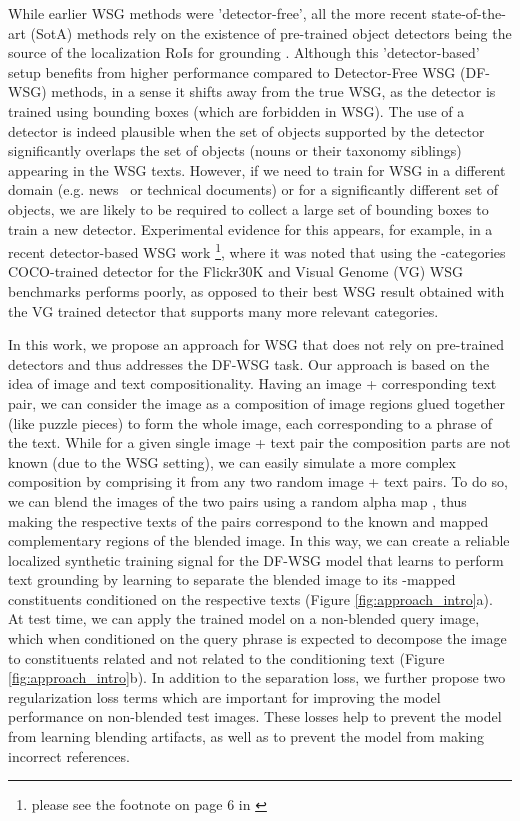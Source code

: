 \documentclass[10pt,twocolumn,letterpaper]{article}
\def\ourstask{DF-WSG}
\def\ourstaskfull{Detector-Free WSG }
\begin{document}
While earlier WSG methods \cite{akbari2019multi, javed2018learning, xiao2017weakly, zhang2018top} were 'detector-free', all the more recent state-of-the-art (SotA) methods rely on the existence of pre-trained object detectors being the source of the localization RoIs for grounding \cite{datta2019align2ground,gupta2020contrastive,wang2019phrase,chen2020counterfactual,chen2020uniter,lu202012}. Although this 'detector-based' setup benefits from higher performance compared to \ourstaskfull (\ourstask) methods, in a sense it shifts away from the true WSG, as the detector is trained using bounding boxes (which are forbidden in WSG). The use of a detector is indeed plausible when the set of objects supported by the detector significantly overlaps the set of objects (nouns or their taxonomy siblings) appearing in the WSG texts. However, if we need to train for WSG in a different domain (e.g. news~\cite{liu2020visualnews} or technical documents) or for a significantly different set of objects, we are likely to be required to collect a large set of bounding boxes to train a new detector. Experimental evidence for this appears, for example, in a recent detector-based WSG work \cite{datta2019align2ground}\footnote{please see the footnote on page 6 in \cite{datta2019align2ground}}, where it was noted that using the -categories COCO-trained detector for the Flickr30K and Visual Genome (VG) WSG benchmarks performs poorly, as opposed to their best WSG result obtained with the VG trained detector that supports many more relevant categories. 

In this work, we propose an approach for WSG that does not rely on pre-trained detectors and thus addresses the \ourstask{} task. Our approach is based on the idea of image and text compositionality. Having an image + corresponding text pair, we can consider the image as a composition of image regions glued together (like puzzle pieces) to form the whole image, each corresponding to a phrase of the text.
While for a given single image + text pair the composition parts are not known (due to the WSG setting), we can easily simulate a more complex composition by comprising it from any two random image + text pairs. To do so, we can blend the images of the two pairs using a random alpha map , thus making the respective texts of the pairs correspond to the known  and  mapped complementary regions of the blended image. In this way, we can create a reliable localized synthetic training signal for the \ourstask{} model that learns to perform text grounding by learning to separate the blended image to its -mapped constituents conditioned on the respective texts (Figure \ref{fig:approach_intro}a). 
At test time, we can apply the trained model on a non-blended query image, which when conditioned on the query phrase is expected to decompose the image to constituents related and not related to the conditioning text (Figure \ref{fig:approach_intro}b).
In addition to the separation loss, we further propose two regularization loss terms which are important for improving the model performance on non-blended test images. These losses help to prevent the model from learning blending artifacts, as well as to prevent the model from making incorrect references.
\end{document}
